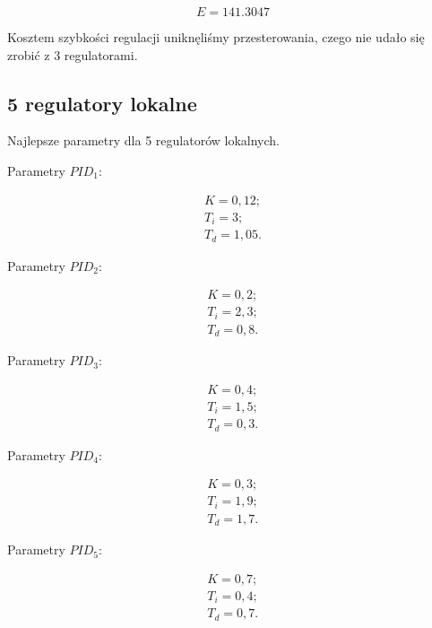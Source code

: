 \begin{equation}
    E = \num{141,3047}
\end{equation}

Kosztem szybkości regulacji uniknęliśmy przesterowania, czego nie udało się zrobić z 3 regulatorami.

\subsection{5 regulatory lokalne}

Najlepsze parametry dla 5 regulatorów lokalnych.

Parametry $PID_1$:

\begin{equation}
\begin{matrix}
    	K = 0,12;\\
    	T_i = 3;\\
    	T_d = 1,05.
\end{matrix}
\end{equation}

Parametry $PID_2$:

\begin{equation}
\begin{matrix}
    	K = 0,2;\\
    	T_i = 2,3;\\
    	T_d = 0,8.
\end{matrix}
\end{equation}

Parametry $PID_3$:

\begin{equation}
\begin{matrix}
    	K = 0,4;\\
    	T_i = 1,5;\\
    	T_d = 0,3.
\end{matrix}
\end{equation}

Parametry $PID_4$:

\begin{equation}
\begin{matrix}
    	K = 0,3;\\
    	T_i = 1,9;\\
    	T_d = 1,7.
\end{matrix}
\end{equation}

Parametry $PID_5$:

\begin{equation}
\begin{matrix}
    	K = 0,7;\\
    	T_i = 0,4;\\
    	T_d = 0,7.
\end{matrix}
\end{equation}


